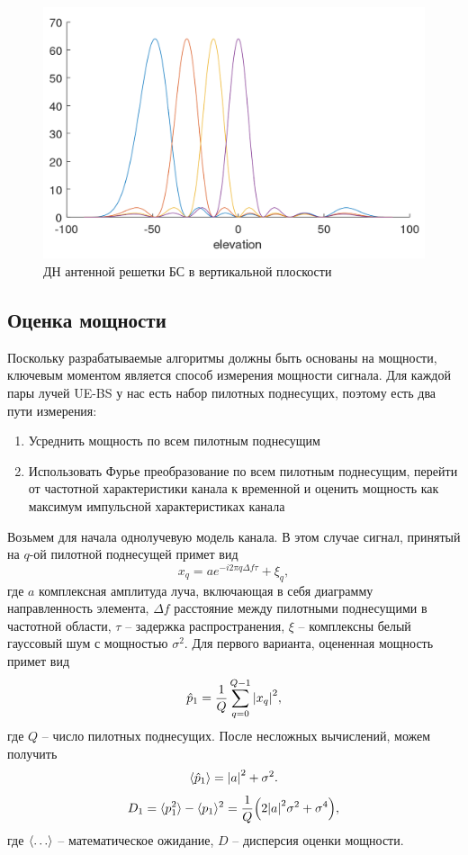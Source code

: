 \begin{figure}[ht]
    \centering
    \includegraphics[width=0.5\linewidth]{figs/fig4.6}
    \caption{ДН антенной решетки БС в вертикальной плоскости}
    \label{fig:4.7}
\end{figure}


\subsection{Оценка мощности}

Поскольку разрабатываемые алгоритмы должны быть основаны на мощности, ключевым
моментом является способ измерения мощности сигнала. Для каждой пары лучей UE-BS
у нас есть набор пилотных поднесущих, поэтому есть два пути измерения:
\begin{enumerate}
    \item Усреднить мощность по всем пилотным поднесущим
    \item Использовать Фурье преобразование по всем пилотным поднесущим, перейти от частотной характеристики канала к временной и оценить мощность как максимум импульсной характеристиках канала
\end{enumerate}

Возьмем для начала однолучевую модель канала. В этом случае сигнал, принятый на $q$-ой пилотной поднесущей примет вид
\begin{equation}
    x_q = a e^{-i2\pi q\Delta f \tau} + \xi_q,
\end{equation}
где $a$ комплексная амплитуда луча, включающая в себя диаграмму направленность
элемента, $\Delta f$ расстояние между пилотными поднесущими в частотной области,
$\tau$ -- задержка распространения, $\xi$ -- комплексны белый гауссовый шум с
мощностью $\sigma^2$.
Для первого варианта, оцененная мощность примет вид
\begin{equation}
    \hat p_1 = \frac{1}{Q} \sum\limits_{q = 0}^{Q - 1} \abs{x_q}^2,
\end{equation}
где $Q$ -- число пилотных поднесущих. После несложных вычислений, можем получить
\begin{equation}
    \langle \hat p_1 \rangle = \abs{a}^2 + \sigma^2.
\end{equation}
\begin{equation}
    D_1 = \langle p_1^2 \rangle - \langle p_1 \rangle^2 = \frac{1}{Q}\qty(2\abs{a}^2 \sigma^2 + \sigma^4),
\end{equation}
где $\mean{\dots}$ -- математическое ожидание, $D$ -- дисперсия оценки мощности.



